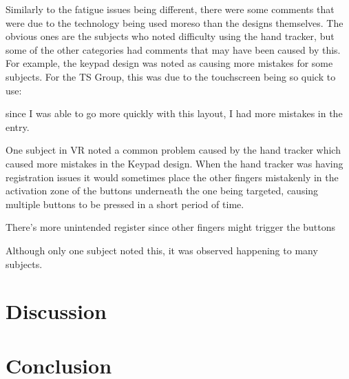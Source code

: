 Similarly to the fatigue issues being different, there were some comments that were due to the technology being used moreso than the designs themselves.
The obvious ones are the subjects who noted difficulty using the hand tracker, but some of the other categories had comments that may have been caused by this.
For example, the keypad design was noted as causing more mistakes for some subjects.
For the TS Group, this was due to the touchscreen being so quick to use:
\begin{displayquote}[TS Subject]
    since I was able to go more quickly with this layout, I had more mistakes in the entry.
\end{displayquote}
One subject in VR noted a common problem caused by the hand tracker which caused more mistakes in the Keypad design.
When the hand tracker was having registration issues it would sometimes place the other fingers mistakenly in the activation zone of the buttons underneath the one being targeted, causing multiple buttons to be pressed in a short period of time.
\begin{displayquote}[VR Subject]
    There's more unintended register since other fingers might trigger the buttons
\end{displayquote}
Although only one subject noted this, it was observed happening to many subjects.


\section{Discussion}



\section{Conclusion}
